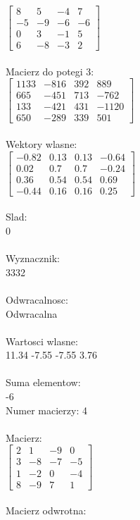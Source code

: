 \documentclass[a4paper,12pt]{article}
\begin{document}
$\begin{bmatrix} 8&5&-4&7\\-5&-9&-6&-6\\0&3&-1&5\\6&-8&-3&2 \end{bmatrix}$
\\
\\
Macierz do potegi 3:\\

$\begin{bmatrix} 1133&-816&392&889\\665&-451&713&-762\\133&-421&431&-1120\\650&-289&339&501 \end{bmatrix}$
\\
\\
Wektory wlasne:\\

$\begin{bmatrix} -0.82&0.13&0.13&-0.64\\0.02&0.7&0.7&-0.24\\0.36&0.54&0.54&0.69\\-0.44&0.16&0.16&0.25 \end{bmatrix}$
\\
\\
Slad:\\
0
\\
\\
Wyznacznik:\\
3332
\\
\\
Odwracalnosc:\\
Odwracalna
\\
\\
Wartosci wlasne:\\
11.34 -7.55 -7.55 3.76
\\
\\
Suma elementow:\\
-6
\\
\newpage
Numer macierzy:
4
\\
\\
Macierz:\\

$\begin{bmatrix} 2&1&-9&0\\3&-8&-7&-5\\1&-2&0&-4\\8&-9&7&1 \end{bmatrix}$
\\
\\
Macierz odwrotna:\\
\end{document}
